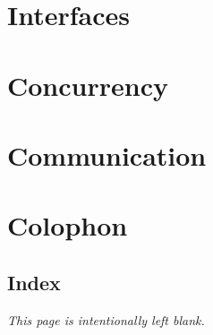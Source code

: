 \documentclass[a4paper,twoside,openleft]{blocksbook}
\begin{document}
\chapter{Interfaces}
\label{chap:interfaces}


\chapter{Concurrency}
\label{chap:channels}


\chapter{Communication}
\label{chap:communication}


\appendix

\chapter{Colophon}


\begin{twocolumn}
\chapter{Index}
\printindex
\end{twocolumn}
\begin{onecolumn}



\newpage
\thispagestyle{empty}
\begin{center}
\emph{This page is intentionally left blank.}
\end{center}
\end{onecolumn}
\end{document}
